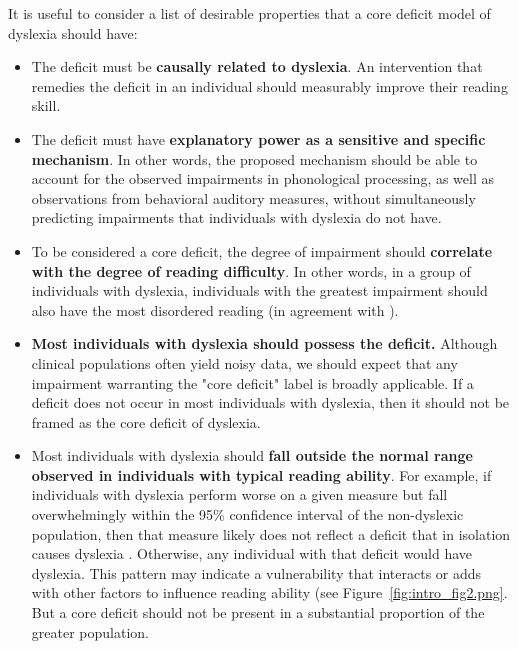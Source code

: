\documentclass[../uwthesis.tex]{subfiles}
\begin{document}
It is useful to consider a list of desirable properties that a core deficit model of dyslexia should have:
\begin{itemize}
    \item The deficit must be \textbf{causally related to dyslexia}. An intervention that remedies the deficit in an individual should measurably improve their reading skill.
    \item The deficit must have \textbf{explanatory power as a sensitive and specific mechanism}. In other words, the proposed mechanism should be able to account for the observed impairments in phonological processing, as well as observations from behavioral auditory measures, without simultaneously predicting impairments that individuals with dyslexia do not have.
    \item To be considered a core deficit, the degree of impairment should \textbf{correlate with the degree of reading difficulty}. In other words, in a group of individuals with dyslexia, individuals with the greatest impairment should also have the most disordered reading (in agreement with \cite{Rosen2003AuditoryAnything}).
    \item \textbf{Most individuals with dyslexia should possess the deficit.} Although clinical populations often yield noisy data, we should expect that any impairment warranting the "core deficit" label is broadly applicable. If a deficit does not occur in most individuals with dyslexia, then it should not be framed as the core deficit of dyslexia.
    \item Most individuals with dyslexia should \textbf{fall outside the normal range observed in individuals with typical reading ability}. For example, if individuals with dyslexia perform worse on a given measure but fall overwhelmingly within the 95\% confidence interval of the non-dyslexic population, then that measure likely does not reflect a deficit that in isolation causes dyslexia \cite{Ramus2003TheoriesAdults}. Otherwise, any individual with that deficit would have dyslexia. This pattern may indicate a vulnerability that interacts or adds with other factors to influence reading ability (see Figure~\ref{fig:intro_fig2.png}. But a core deficit should not be present in a substantial proportion of the greater population.
\end{itemize}
 
\end{document}
